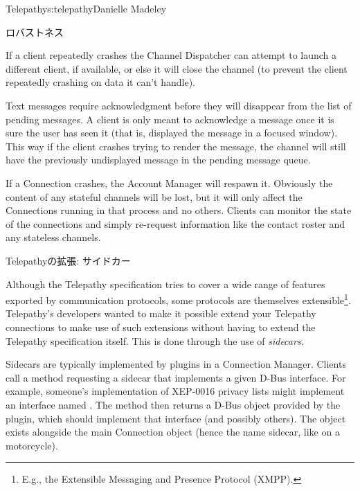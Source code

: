 \begin{aosachapter}{Telepathy}{s:telepathy}{Danielle Madeley}
\begin{aosasect1}{ロバストネス}
\begin{aosaitemize}
    If a client repeatedly crashes the Channel Dispatcher can attempt
    to launch a different client, if available, or else it will close
    the channel (to prevent the client repeatedly crashing on data it
    can't handle).

    Text messages require acknowledgment before they will disappear
    from the list of pending messages. A client is only meant to
    acknowledge a message once it is sure the user has seen it (that
    is, displayed the message in a focused window). This way if the
    client crashes trying to render the message, the channel will
    still have the previously undisplayed message in the pending
    message queue.

  \item If a Connection crashes, the Account Manager will respawn
    it. Obviously the content of any stateful channels will be lost,
    but it will only affect the Connections running in that process
    and no others. Clients can monitor the state of the connections
    and simply re-request information like the contact roster and any
    stateless channels.

\end{aosaitemize}

\end{aosasect1}

\begin{aosasect1}{Telepathyの拡張: サイドカー}

Although the Telepathy specification tries to cover a wide range of
features exported by communication protocols, some protocols are
themselves extensible\footnote{E.g., the Extensible Messaging and
 Presence Protocol (XMPP).}.  Telepathy's developers wanted to make
it possible extend your Telepathy connections to make use of such
extensions without having to extend the Telepathy specification
itself. This is done through the use of \emph{sidecars}.

Sidecars are typically implemented by plugins in a Connection Manager.
Clients call a method requesting a sidecar that implements a given
D-Bus interface.  For example, someone's implementation of XEP-0016
privacy lists might implement an interface named
. The method then returns a D-Bus
object provided by the plugin, which should implement that interface
(and possibly others). The object exists alongside the main Connection
object (hence the name sidecar, like on a motorcycle).


\end{aosasect1}
\end{aosachapter}

